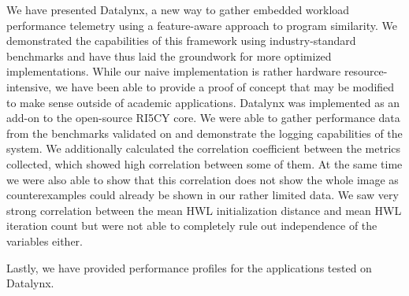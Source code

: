 \documentclass[../bachelor_paper.tex]{subfiles}
\begin{document}
We have presented Datalynx, a new way to gather embedded workload performance telemetry using a feature-aware approach to program similarity. We demonstrated the capabilities of this framework using industry-standard benchmarks and have thus laid the groundwork for more optimized implementations. While our naive implementation is rather hardware resource-intensive, we have been able to provide a proof of concept that may be modified to make sense outside of academic applications. Datalynx was implemented as an add-on to the open-source RI5CY core. We were able to gather performance data from the benchmarks validated on and demonstrate the logging capabilities of the system. We additionally calculated the correlation coefficient between the metrics collected, which showed high correlation between some of them. At the same time we were also able to show that this correlation does not show the whole image as counterexamples could already be shown in our rather limited data. We saw very strong correlation between the mean \ac{HWL} initialization distance and mean \ac{HWL} iteration count but were not able to completely rule out independence of the variables either.

Lastly, we have provided performance profiles for the applications tested on Datalynx.

\isstandalone



\fi
\end{document}
